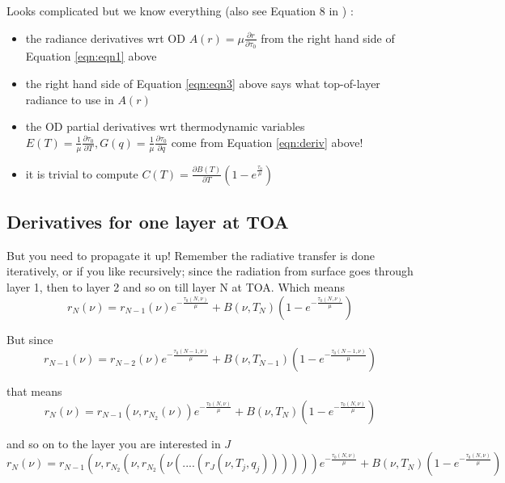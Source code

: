 \documentclass[11pt]{article}
\begin{document}
Looks complicated but we know everything (also see \eg Equation 8 in \citep{liu:06}) : 
\begin{itemize}
\item the radiance derivatives wrt OD $A(r) =  \mu \frac{\partial r}{\partial \tau_0} $ from the right hand side of Equation \ref{eqn:eqn1} above
\item the right hand side of Equation \ref{eqn:eqn3} above says what top-of-layer radiance to use in $A(r)$
\item the OD partial derivatives wrt thermodynamic variables $E(T) =  \frac{1}{\mu} \frac{\partial \tau_0}{\partial T} , G(q) =  \frac{1}{\mu} \frac{\partial \tau_0}{\partial q} $ come from Equation \ref{eqn:deriv} above!
\item it is trivial to compute $C(T) = \frac{\partial B(T)}{\partial T} (1 - e^{\frac{\tau_0}{\mu}})$
\end{itemize}

\subsection{Derivatives for one layer at TOA}

But you need to propagate it up! Remember the radiative transfer is done iteratively, or if you like recursively; since the radiation from surface goes through layer 1, then to layer 2 and so on till layer N at TOA. Which means
\begin{equation}
r_N(\nu) = r_{N-1}(\nu) e^{-\frac{\tau_{0}(N,\nu)}{\mu}} + B(\nu,T_N) (1 - e^{-\frac{\tau_{0}(N,\nu)}{\mu}})
\end{equation}

But since
\begin{equation}
r_{N-1}(\nu) = r_{N-2}(\nu) e^{-\frac{\tau_{0}(N-1,\nu)}{\mu}} + B(\nu,T_{N-1}) (1 - e^{-\frac{\tau_{0}(N-1,\nu)}{\mu}})
\end{equation}

that means 
\begin{equation}
r_N(\nu) = r_{N-1}(\nu,r_{N_2}(\nu)) e^{-\frac{\tau_{0}(N,\nu)}{\mu}} + B(\nu,T_N) (1 - e^{-\frac{\tau_{0}(N,\nu)}{\mu}})
\end{equation}

and so on to the layer you are interested in $J$
\begin{equation}
r_N(\nu) = r_{N-1}(\nu,r_{N_2}(\nu,r_{N_2}(\nu(....(r_{J}(\nu,T_j,q_j)))))) e^{-\frac{\tau_{0}(N,\nu)}{\mu}} + B(\nu,T_N) (1 - e^{-\frac{\tau_{0}(N,\nu)}{\mu}})
\label{eqn:eqnNJ}
\end{equation}
\end{document}
